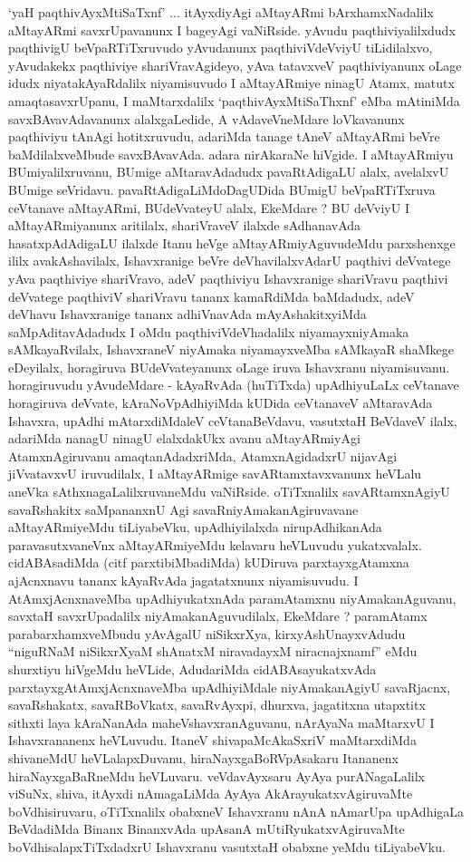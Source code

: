\begin{artha}
`yaH paqthivAyxMtiSaTxnf' ... itAyxdiyAgi aMtayARmi bArxhamxNadalilx aMtayARmi savxrUpavanunx I bageyAgi vaNiRside. yAvudu paqthiviyalilxdudx paqthivigU beVpaRTiTxruvudo yAvudanunx paqthiviVdeVviyU tiLidilalxvo, yAvudakekx paqthiviye shariVravAgideyo, yAva tatavxveV paqthiviyanunx oLage idudx niyatakAyaRdalilx niyamisuvudo I aMtayARmiye ninagU Atamx, matutx amaqtasavxrUpanu, I maMtarxdalilx `paqthivAyxMtiSaThxnf' eMba mAtiniMda savxBAvavAdavanunx alalxgaLedide, A vAdaveVneMdare loVkavanunx paqthiviyu tAnAgi hotitxruvudu, adariMda tanage tAneV aMtayARmi beVre baMdilalxveMbude savxBAvavAda. adara nirAkaraNe hiVgide. I aMtayARmiyu BUmiyalilxruvanu, BUmige aMtaravAdadudx pavaRtAdigaLU alalx, avelalxvU BUmige seVridavu. pavaRtAdigaLiMdoDagUDida BUmigU beVpaRTiTxruva ceVtanave aMtayARmi, BUdeVvateyU alalx, EkeMdare ? BU deVviyU I aMtayARmiyanunx aritilalx, shariVraveV ilalxde sAdhanavAda hasatxpAdAdigaLU ilalxde Itanu heVge aMtayARmiyAguvudeMdu parxshenxge ililx avakAshavilalx, Ishavxranige beVre deVhavilalxvAdarU paqthivi deVvatege yAva paqthiviye shariVravo, adeV paqthiviyu Ishavxranige shariVravu paqthivi deVvatege paqthiviV shariVravu tananx kamaRdiMda baMdadudx, adeV deVhavu Ishavxranige tananx adhiVnavAda mAyAshakitxyiMda saMpAditavAdadudx I oMdu paqthiviVdeVhadalilx niyamayxniyAmaka sAMkayaRvilalx, IshavxraneV niyAmaka niyamayxveMba sAMkayaR shaMkege eDeyilalx, horagiruva BUdeVvateyanunx oLage iruva Ishavxranu niyamisuvanu. horagiruvudu yAvudeMdare - kAyaRvAda (huTiTxda) upAdhiyuLaLx ceVtanave horagiruva deVvate, kAraNoVpAdhiyiMda kUDida  ceVtanaveV aMtaravAda Ishavxra, upAdhi mAtarxdiMdaleV ceVtanaBeVdavu, vasutxtaH BeVdaveV ilalx, adariMda nanagU ninagU elalxdakUkx avanu aMtayARmiyAgi AtamxnAgiruvanu amaqtanAdadxriMda, AtamxnAgidadxrU nijavAgi jiVvatavxvU iruvudilalx, I aMtayARmige savARtamxtavxvanunx heVLalu aneVka sAthxnagaLalilxruvaneMdu vaNiRside. oTiTxnalilx savARtamxnAgiyU savaRshakitx saMpananxnU Agi savaRniyAmakanAgiruvavane aMtayARmiyeMdu tiLiyabeVku, upAdhiyilalxda nirupAdhikanAda paravasutxvaneVnx aMtayARmiyeMdu kelavaru heVLuvudu yukatxvalalx. cidABAsadiMda (citf parxtibiMbadiMda) kUDiruva parxtayxgAtamxna ajAcnxnavu tananx kAyaRvAda jagatatxnunx niyamisuvudu. I AtAmxjAcnxnaveMba upAdhiyukatxnAda paramAtamxnu niyAmakanAguvanu, savxtaH savxrUpadalilx niyAmakanAguvudilalx, EkeMdare ? paramAtamx parabarxhamxveMbudu yAvAgalU niSikxrXya, kirxyAshUnayxvAdudu ``niguRNaM niSikxrXyaM shAnatxM niravadayxM niracnajxnamf'' eMdu shurxtiyu hiVgeMdu heVLide, AdudariMda cidABAsayukatxvAda parxtayxgAtAmxjAcnxnaveMba upAdhiyiMdale niyAmakanAgiyU savaRjacnx, savaRshakatx, savaRBoVkatx, savaRvAyxpi, dhurxva, jagatitxna utapxtitx sithxti laya kAraNanAda maheVshavxranAguvanu, nArAyaNa maMtarxvU I Ishavxrananenx heVLuvudu. ItaneV shivapaMcAkaSxriV maMtarxdiMda shivaneMdU heVLalapxDuvanu, hiraNayxgaBoRVpAsakaru Itananenx hiraNayxgaBaRneMdu heVLuvaru. veVdavAyxsaru AyAya purANagaLalilx viSuNx, shiva, itAyxdi nAmagaLiMda AyAya AkArayukatxvAgiruvaMte boVdhisiruvaru, oTiTxnalilx obabxneV Ishavxranu nAnA nAmarUpa upAdhigaLa BeVdadiMda Binanx BinanxvAda upAsanA mUtiRyukatxvAgiruvaMte boVdhisalapxTiTxdadxrU Ishavxranu vasutxtaH obabxne yeMdu tiLiyabeVku.
\end{artha}

